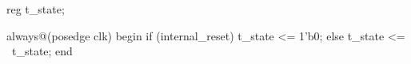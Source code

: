 \begin{vcode}
reg t_state;

always@(posedge clk)
begin
    if (internal_reset)
        t_state <= 1'b0;
    else
        t_state <= ~t_state;
end
\end{vcode}

